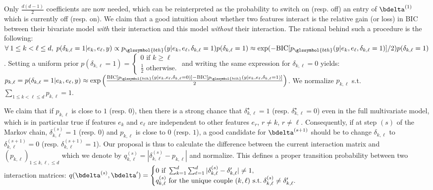 Only $\frac{d(d-1)}{2}$ coefficients are now needed, which can be reinterpreted as the probability to switch on (resp. off) an entry of $\bdelta^{(1)}$ which is currently off (resp. on). We claim that a good intuition about whether two features interact is the relative gain (or loss) in BIC between their bivariate model \textit{with} their interaction and this model \textit{without} their interaction. The rational behind such a procedure is the following: $\forall \: 1 \leq k < \ell \leq d, \; p(\delta_{k,\ell}=1 | e_k, e_{\ell}, y) \propto p_{\glssymbol{bth}}(y | e_k, e_{\ell}, \delta_{k,\ell}=1) p(\delta_{k,\ell}=1) \approx \exp(-\text{BIC}[p_{\glssymbol{bth}}(y | e_k, e_{\ell}, \delta_{k,\ell}=1)]/2) p(\delta_{k,\ell}=1)$. Setting a uniform prior $p(\delta_{k,\ell}=1) =\begin{cases} 0 \text{ if } k \geq \ell \\ \frac{1}{2} \text{ otherwise.} \end{cases}$ and writing the same expression for $\delta_{k,\ell} = 0$ yields: $p_{k,\ell} = p(\delta_{k,\ell}=1 | e_k, e_{\ell}, y) \approx \exp \left( \frac{\text{BIC}[p_{\glssymbol{bth}}(y | e_k, e_{\ell}, \delta_{k,\ell}=0)]-\text{BIC}[p_{\glssymbol{bth}}(y | e_k, e_{\ell}, \delta_{k,\ell}=1)]}{2} \right)$. We normalize $p_{k,\ell}$ s.t.\ $\sum_{1 \leq k < \ell \leq d} p_{k,\ell} = 1$.

We claim that if $p_{k,\ell}$ is close to $1$ (resp. $0$), then there is a strong chance that $\delta_{k,\ell}^\star = 1$ (resp. $\delta_{k,\ell}^\star = 0$) even in the full multivariate model, which is in particular true if features $e_k$ and $e_{\ell}$ are independent to other features $e_r$, $r \neq k$, $r \neq \ell$. Consequently, if at step $(s)$ of the Markov chain, $\delta_{k,\ell}^{(s)} = 1$ (resp. $0$) and $p_{k,\ell}$ is close to $0$ (resp. $1$), a good candidate for $\bdelta^{(s+1)}$ should be to change $\delta_{k,\ell}$ to $\delta_{k,\ell}^{(s+1)} = 0$ (resp. $\delta_{k,\ell}^{(s+1)} = 1$). Our proposal is thus to calculate the difference between the current interaction matrix and $(p_{k,\ell})_{1 \leq k,\ell, \leq d}$ which we denote by $q_{k,\ell}^{(s)} = |\delta_{k,\ell}^{(s)} - p_{k,\ell}|$ and normalize. This defines a proper transition probability between two interaction matrices: $q(\bdelta^{(s)},\bdelta') = \begin{cases} 0 \text{ if } \sum_{k=1}^d \sum_{\ell=1}^d |\delta^{(s)}_{k,\ell} - \delta_{k,\ell}'| \neq 1, \\ q_{k,\ell}^{(s)} \text{ for the unique couple } (k,\ell) \text{ s.t.} \: \delta^{(s)}_{k,\ell} \neq \delta_{k,\ell}'. \end{cases}$

